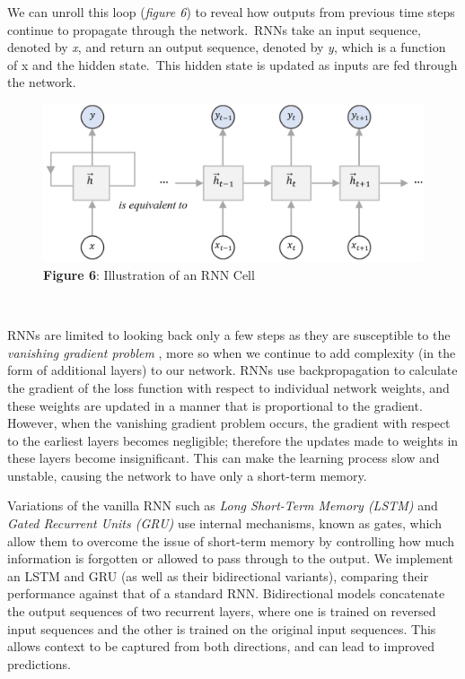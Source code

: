 \documentclass[12pt,a4paper]{article}
\begin{document}
\hspace{-18pt}\begin{minipage}{0.42\textwidth}	
	 We can unroll this loop (\textit{figure 6}) to reveal how outputs from previous time steps continue to propagate through the network.\ RNNs take an input sequence, denoted by \textit{x}, and return an output sequence, denoted by \textit{y}, which is a function of x and the hidden state.\ This hidden state is updated as inputs are fed through the network.\\
\end{minipage}
\hspace{10pt}
\begin{minipage}{0.55\textwidth}
	\vspace{-20pt}
	\begin{figure}[H]
		\includegraphics[width=1\textwidth]{Images/RNN_diagram1.png}\\
		\centering\textbf{Figure 6}: Illustration of an RNN Cell
	\end{figure}
\end{minipage}\\\vspace{-10pt}

\noindent RNNs are limited to looking back only a few steps as they are susceptible to the \textit{vanishing gradient problem} \cite{pascanu2013difficulty}, more so when we continue to add complexity (in the form of additional layers) to our network. RNNs use backpropagation to calculate the gradient of the loss function with respect to individual network weights, and these weights are updated in a manner that is proportional to the gradient. However, when the vanishing gradient problem occurs, the gradient with respect to the earliest layers becomes negligible; therefore the updates made to weights in these layers become insignificant. This can make the learning process slow and unstable, causing the network to have only a short-term memory.

Variations of the vanilla RNN such as \textit{Long Short-Term Memory (LSTM)} \cite{hochreiter1997long} and \textit{Gated Recurrent Units (GRU)}\cite{cho2014learning} use internal mechanisms, known as gates, which allow them to overcome the issue of short-term memory by controlling how much information is forgotten or allowed to pass through to the output. We implement an LSTM and GRU (as well as their bidirectional variants), comparing their performance against that of a standard RNN. Bidirectional models concatenate the output sequences of two recurrent layers, where one is trained on reversed input sequences and the other is trained on the original input sequences. This allows context to be captured from both directions, and can lead to improved predictions.
\end{document}

